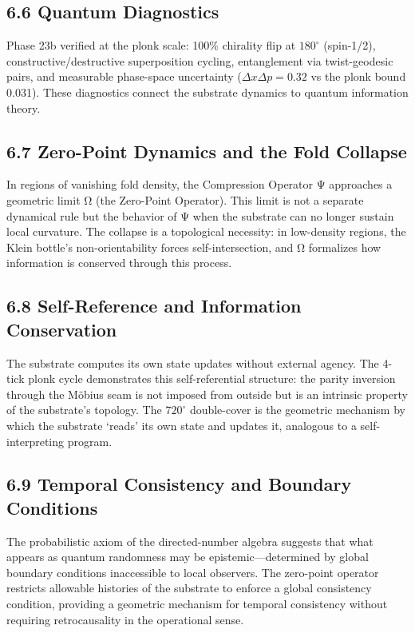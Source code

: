 \documentclass[
  11pt,
]{article}
\begin{document}
\subsection{6.6 Quantum Diagnostics}\label{quantum-diagnostics}

Phase 23b verified at the plonk scale: 100\% chirality flip at
\(180^{\circ}\) (spin-1/2), constructive/destructive superposition
cycling, entanglement via twist-geodesic pairs, and measurable
phase-space uncertainty (\(\Delta x \Delta p = 0.32\) vs the plonk bound
0.031). These diagnostics connect the substrate dynamics to quantum
information theory.

\subsection{6.7 Zero-Point Dynamics and the Fold
Collapse}\label{zero-point-dynamics-and-the-fold-collapse}

In regions of vanishing fold density, the Compression Operator Ψ
approaches a geometric limit Ω (the Zero-Point Operator). This limit is
not a separate dynamical rule but the behavior of Ψ when the substrate
can no longer sustain local curvature. The collapse is a topological
necessity: in low-density regions, the Klein bottle's non-orientability
forces self-intersection, and Ω formalizes how information is conserved
through this process.

\subsection{6.8 Self-Reference and Information
Conservation}\label{self-reference-and-information-conservation}

The substrate computes its own state updates without external agency.
The 4-tick plonk cycle demonstrates this self-referential structure: the
parity inversion through the Möbius seam is not imposed from outside but
is an intrinsic property of the substrate's topology. The
\(720^{\circ}\) double-cover is the geometric mechanism by which the
substrate `reads' its own state and updates it, analogous to a
self-interpreting program.

\subsection{6.9 Temporal Consistency and Boundary
Conditions}\label{temporal-consistency-and-boundary-conditions}

The probabilistic axiom of the directed-number algebra suggests that
what appears as quantum randomness may be epistemic---determined by
global boundary conditions inaccessible to local observers. The
zero-point operator restricts allowable histories of the substrate to
enforce a global consistency condition, providing a geometric mechanism
for temporal consistency without requiring retrocausality in the
operational sense.
\end{document}
